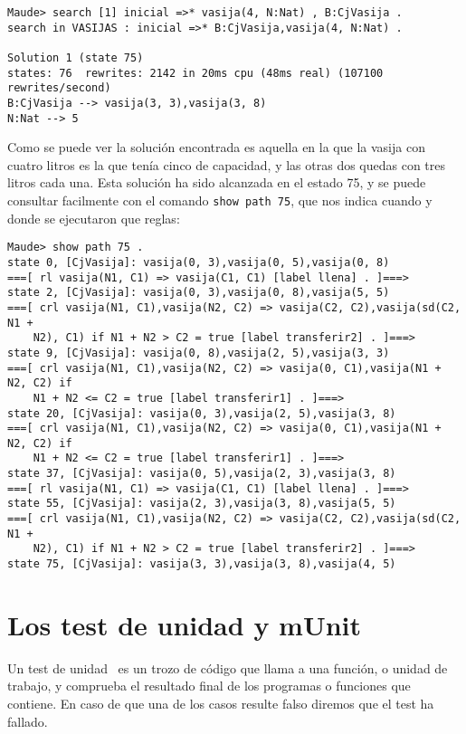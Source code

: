 {\codesize
\begin{verbatim}
Maude> search [1] inicial =>* vasija(4, N:Nat) , B:CjVasija .
search in VASIJAS : inicial =>* B:CjVasija,vasija(4, N:Nat) .

Solution 1 (state 75)
states: 76  rewrites: 2142 in 20ms cpu (48ms real) (107100 rewrites/second)
B:CjVasija --> vasija(3, 3),vasija(3, 8)
N:Nat --> 5
\end{verbatim}
}

Como se puede ver la solución encontrada es aquella en la que la vasija con cuatro litros es la que tenía cinco de capacidad, y las otras dos quedas con tres litros cada una. Esta solución ha sido alcanzada en el estado 75, y se puede consultar facilmente con el comando \verb"show path 75", que nos indica cuando y donde se ejecutaron que reglas: \par

{\codesize
\begin{verbatim}
Maude> show path 75 .
state 0, [CjVasija]: vasija(0, 3),vasija(0, 5),vasija(0, 8)
===[ rl vasija(N1, C1) => vasija(C1, C1) [label llena] . ]===>
state 2, [CjVasija]: vasija(0, 3),vasija(0, 8),vasija(5, 5)
===[ crl vasija(N1, C1),vasija(N2, C2) => vasija(C2, C2),vasija(sd(C2, N1 +
    N2), C1) if N1 + N2 > C2 = true [label transferir2] . ]===>
state 9, [CjVasija]: vasija(0, 8),vasija(2, 5),vasija(3, 3)
===[ crl vasija(N1, C1),vasija(N2, C2) => vasija(0, C1),vasija(N1 + N2, C2) if
    N1 + N2 <= C2 = true [label transferir1] . ]===>
state 20, [CjVasija]: vasija(0, 3),vasija(2, 5),vasija(3, 8)
===[ crl vasija(N1, C1),vasija(N2, C2) => vasija(0, C1),vasija(N1 + N2, C2) if
    N1 + N2 <= C2 = true [label transferir1] . ]===>
state 37, [CjVasija]: vasija(0, 5),vasija(2, 3),vasija(3, 8)
===[ rl vasija(N1, C1) => vasija(C1, C1) [label llena] . ]===>
state 55, [CjVasija]: vasija(2, 3),vasija(3, 8),vasija(5, 5)
===[ crl vasija(N1, C1),vasija(N2, C2) => vasija(C2, C2),vasija(sd(C2, N1 +
    N2), C1) if N1 + N2 > C2 = true [label transferir2] . ]===>
state 75, [CjVasija]: vasija(3, 3),vasija(3, 8),vasija(4, 5)
\end{verbatim}
}

\section{Los test de unidad y mUnit}

Un test de unidad~\cite{unitTests} es un trozo de código que llama a una función, o unidad de trabajo, y comprueba el resultado final de los programas o funciones que contiene. En caso de que una de los casos resulte falso diremos que el test ha fallado.\par

